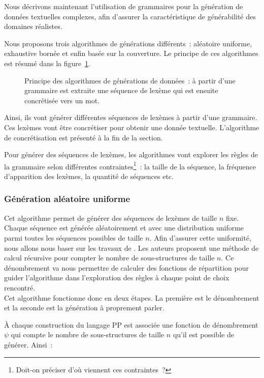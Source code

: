 Nous décrivons maintenant l'utilisation de grammaires pour la génération de
données textuelles complexes, afin d'assurer la caractéristique de générabilité
des domaines réalistes.

Nous proposons trois algorithmes de générations différents~: aléatoire uniforme,
exhaustive bornée et enfin basée sur la couverture. Le principe de ces
algorithmes est résumé dans la figure~\ref{figure:data:grammar}.
%
\begin{figure}


\caption{\label{figure:data:grammar} Principe des algorithmes de générations de
données~: à partir d'une grammaire est extraite une séquence de lexème qui est
ensuite concrétisée vers un mot.}

\end{figure}
%
Ainsi, ils vont générer différentes séquences de lexèmes à partir d'une
grammaire. Ces lexèmes vont être concrétiser pour obtenir une donnée
textuelle. L'algorithme de concrétisation est présenté à la fin de la section.

Pour générer des séquences de lexèmes, les algorithmes vont explorer les règles
de la grammaire selon différentes contraintes\footnote{Doit-on préciser d'où
viennent ces contraintes~?}~: la taille de la séquence, la fréquence
d'apparition des lexèmes, la quantité de séquences etc.

\subsubsection{Génération aléatoire uniforme}
\label{subsection:data:random_uniform_generation}

Cet algorithme permet de générer des séquences de lexèmes de taille $n$ fixe.
Chaque séquence est générée aléatoirement et avec une distribution uniforme
parmi toutes les séquences possibles de taille $n$. Afin d'assurer cette
uniformité, nous allons nous baser sur les travaux de . Les
auteurs proposent une méthode de calcul récursive pour compter le nombre de
sous-structures de taille $n$. Ce dénombrement va nous permettre de calculer des
fonctions de répartition pour guider l'algorithme dans l'exploration des règles
à chaque point de choix rencontré. \\
Cet algorithme fonctionne donc en deux étapes. La première est le dénombrement
et la seconde est la génération à proprement parler.

À chaque construction du langage PP est associée une fonction de dénombrement
$\psi$ qui compte le nombre de sous-structures de taille $n$ qu'il est possible
de générer. Ainsi~:

